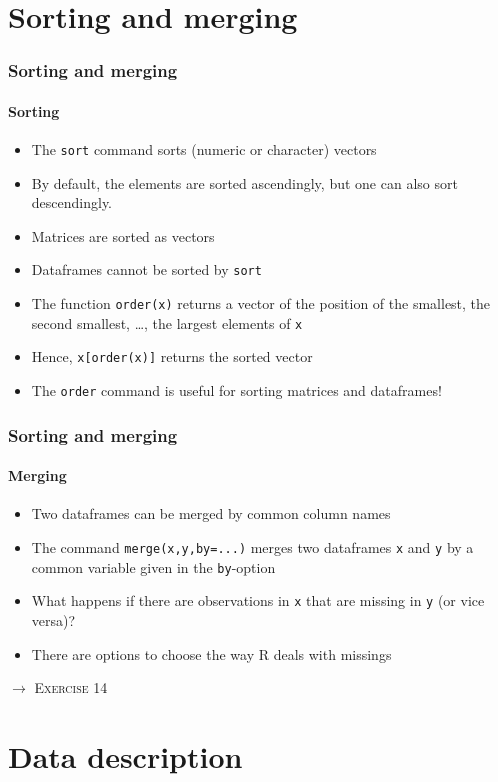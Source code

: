 \documentclass[title={Introduction to R}, author={Mutschler and Zaharieva}, inst={Institute for Econometrics and Empirical Economics}]{beamer}
\begin{document}
\section{Sorting and merging}
\begin{frame}
\frametitle{Sorting and merging}
\framesubtitle{Sorting}
\begin{itemize}
\item The \texttt{sort} command sorts (numeric or character) vectors
\item By default, the elements are sorted ascendingly, but one can also sort
descendingly.
\item Matrices are sorted as vectors
\item Dataframes cannot be sorted by \texttt{sort}
\item The function \texttt{order(x)} returns a vector of the position of the
smallest, the second smallest, \ldots , the largest elements of \texttt{x}
\item Hence, \texttt{x[order(x)]} returns the sorted vector
\item The \texttt{order} command is useful for sorting matrices and
dataframes!
\end{itemize}
\end{frame}


\begin{frame}
\frametitle{Sorting and merging}
\framesubtitle{Merging}
\begin{itemize}
\item Two dataframes can be merged by common column names
\item The command \texttt{merge(x,y,by=...)} merges two dataframes \texttt{x}
and \texttt{y} by a common variable given in the \texttt{by}-option
\item What happens if there are observations in \texttt{x} that are missing
in \texttt{y} (or vice versa)?
\item There are options to choose the way R deals with missings
\end{itemize}\pause
$\longrightarrow $ \textsc{Exercise 14}
\end{frame}

\section{Data description}
\end{document}
